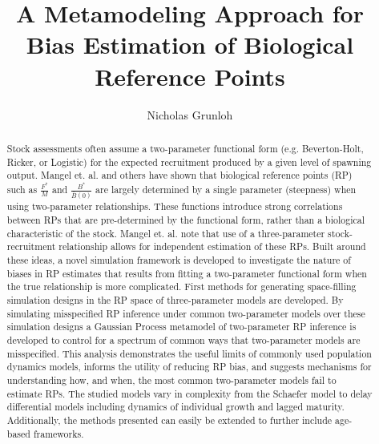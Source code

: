\documentclass[12pt]{ucscthesis}
\title{A Metamodeling Approach for Bias Estimation of Biological Reference Points} %
\author{Nicholas Grunloh}
\begin{document}
%
\begin{frontmatter}

%
\maketitle
\copyrightpage
%
\tableofcontents
\listoffigures

%
\begin{abstract}
Stock assessments often assume a two-parameter functional form
(e.g. Beverton-Holt, Ricker, or Logistic) for the expected recruitment produced by a
given level of spawning output. Mangel et. al. \cite{mangel_perspective_2013} %
and others have shown that biological reference points (RP) such as $\frac{F^*}{M}$
and $\frac{B^*}{\bar{B}(0)}$ are largely determined by a single parameter
(steepness) when using two-parameter relationships. These functions introduce
strong correlations between RPs that are pre-determined by the functional form, 
rather than a biological characteristic of the stock. Mangel et. al. note that 
use of a three-parameter stock-recruitment relationship allows for independent 
estimation of these RPs. 
Built around these ideas, a novel simulation framework is developed to investigate  %
the nature of biases in RP estimates that results from fitting a 
two-parameter functional form when the true relationship is more complicated. %
First methods for generating space-filling simulation designs in the RP space of 
three-parameter models are developed. %
By simulating misspecified RP inference under common two-parameter models over 
these simulation designs a Gaussian Process metamodel of two-parameter RP 
inference is developed to control for a spectrum of common ways that two-parameter 
models are misspecified. 
This analysis demonstrates the useful limits of 
commonly used population dynamics models, informs the utility of reducing RP 
bias, and suggests mechanisms for understanding how, and when, the most common 
two-parameter models fail to estimate RPs.
The studied models vary in complexity from the Schaefer model to delay 
differential models including dynamics of individual growth and lagged maturity. Additionally, 
the methods presented can easily be extended to further include age-based frameworks.



\end{abstract}
\end{frontmatter}
\end{document}
